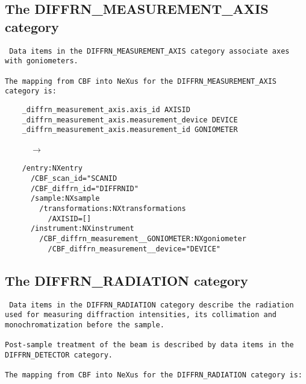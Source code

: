 \documentclass[11pt]{article}
\begin{document}
{{\subsection{The DIFFRN\_MEASUREMENT\_AXIS category}

{\footnotesize \tt
Data items in the DIFFRN\_MEASUREMENT\_AXIS category associate axes with goniometers.\\
~~\\
The mapping from CBF into NeXus for the DIFFRN\_MEASUREMENT\_AXIS category is:

\begin{verbatim}     
    _diffrn_measurement_axis.axis_id AXISID
    _diffrn_measurement_axis.measurement_device DEVICE
    _diffrn_measurement_axis.measurement_id GONIOMETER
\end{verbatim}
~~~~~~{\bf{}$\rightarrow$}\\
\begin{verbatim}
    /entry:NXentry
      /CBF_scan_id="SCANID
      /CBF_diffrn_id="DIFFRNID"
      /sample:NXsample
        /transformations:NXtransformations
          /AXISID=[]      
      /instrument:NXinstrument
        /CBF_diffrn_measurement__GONIOMETER:NXgoniometer
          /CBF_diffrn_measurement__device="DEVICE"
\end{verbatim}
}
       


\subsection{The DIFFRN\_RADIATION category}

{\footnotesize \tt
Data items in the DIFFRN\_RADIATION category describe
the radiation used for measuring diffraction intensities,
its collimation and monochromatization before the sample.\\
~~\\
Post-sample treatment of the beam is described by data
items in the DIFFRN\_DETECTOR category.\\
~~\\
The mapping from CBF into NeXus for the DIFFRN\_RADIATION category is:

}}}
\end{document}
